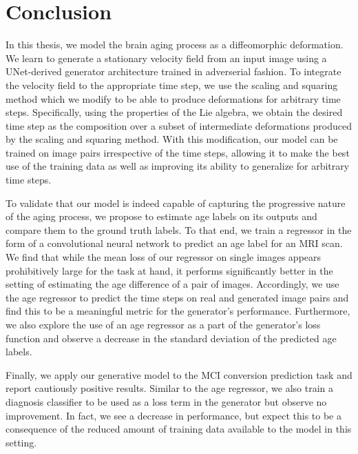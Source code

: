 \chapter{Conclusion}
In this thesis, we model the brain aging process as a diffeomorphic deformation.
We learn to generate a stationary velocity field from an input image using a UNet-derived generator architecture trained in adverserial fashion.
To integrate the velocity field to the appropriate time step, we use the scaling and squaring method which we modify to be able to produce deformations for arbitrary time steps. Specifically, using the properties of the Lie algebra, we obtain the desired time step as the composition over a subset of intermediate deformations produced by the scaling and squaring method. With this modification, our model can be trained on image pairs irrespective of the time steps, allowing it to make the best use of the training data as well as improving its ability to generalize for arbitrary time steps.

To validate that our model is indeed capable of capturing the progressive nature of the aging process, we propose to estimate age labels on its outputs and compare them to the ground truth labels.
To that end, we train a regressor in the form of a convolutional neural network to predict an age label for an MRI scan.
We find that while the mean loss of our regressor on single images appears prohibitively large for the task at hand, it performs significantly better in the setting of estimating the age difference of a pair of images.
Accordingly, we use the age regressor to predict the time steps on real and generated image pairs and find this to be a meaningful metric for the generator's performance.
Furthermore, we also explore the use of an age regressor as a part of the generator's loss function and observe a decrease in the standard deviation of the predicted age labels.

Finally, we apply our generative model to the MCI conversion prediction task and report cautiously positive results.
Similar to the age regressor, we also train a diagnosis classifier to be used as a loss term in the generator but observe no improvement. In fact, we see a decrease in performance, but expect this to be a consequence of the reduced amount of training data available to the model in this setting.
